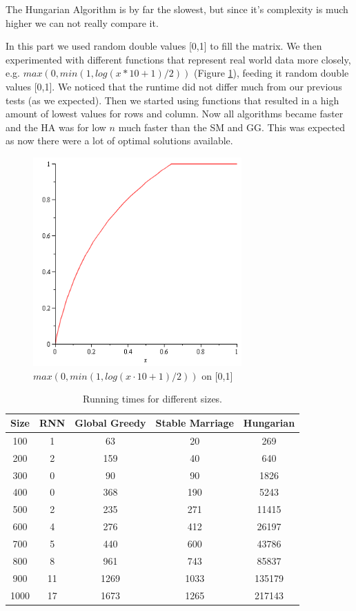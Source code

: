 \documentclass[a4paper,11pt]{article}
\begin{document}
The Hungarian Algorithm is by far the slowest, but since it's complexity is much higher we can not really compare it.

In this part we used random double values [0,1] to fill the matrix. We then experimented with different functions that represent real world data more closely, e.g. $max(0,min(1,log(x*10 + 1)/2))$ (Figure \ref{logfill}), feeding it random double values [0,1]. We noticed that the runtime did not differ much from our previous tests (as we expected). Then we started using functions that resulted in a high amount of lowest values for rows and column. Now all algorithms became faster and the HA was for low $n$ much faster than the SM and GG. This was expected as now there were a lot of optimal solutions available.

\begin{figure}[ht!]
\centering 
\includegraphics[width=80mm]{logfunction.png}
\caption{$max(0,min(1,log(x \cdot 10 + 1)/2))$ on [0,1]}
\label{logfill} 
\end{figure}

\begin{table}[tbh]
\centering
\begin{tabular}{|c|c|c|c|c|}
\hline 
Size & RNN & Global Greedy & Stable Marriage & Hungarian \tabularnewline
\hline 
\hline 
 100 & 1 & 63 & 20 & 269\tabularnewline
\hline
 200 & 2 & 159 & 40 & 640\tabularnewline
\hline 
 300 & 0 & 90 & 90 & 1826\tabularnewline
\hline 
 400 & 0 & 368 & 190 & 5243\tabularnewline
\hline 
 500 & 2 & 235 & 271 & 11415\tabularnewline
\hline 
 600 & 4 & 276 & 412 & 26197\tabularnewline
\hline 
 700 & 5 & 440 & 600 & 43786\tabularnewline
\hline
 800 & 8 & 961 & 743 & 85837\tabularnewline
\hline 
 900 & 11 & 1269 & 1033 & 135179\tabularnewline
\hline
 1000 & 17 & 1673 & 1265 & 217143\tabularnewline
\hline 
\end{tabular}
\caption{Running times for different sizes.}
\label{runtimes}
\end{table}
\end{document}
